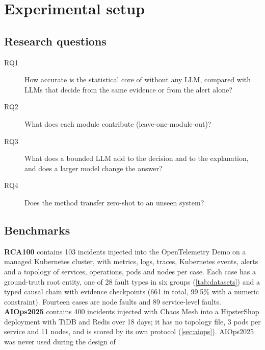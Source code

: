 \section{Experimental setup}\label{sec:setup}

\subsection{Research questions}
\begin{description}
\item[RQ1] How accurate is the statistical core of \gama{} without any LLM, compared with LLMs that decide from the same evidence or
from the alert alone?
\item[RQ2] What does each module contribute (leave-one-module-out)?
\item[RQ3] What does a bounded LLM add to the decision and to the explanation, and does a larger model change the answer?
\item[RQ4] Does the method transfer zero-shot to an unseen system?
\end{description}

\subsection{Benchmarks}
\textbf{RCA100} \citep{cai2026benchmark} contains 103 incidents injected into the OpenTelemetry Demo on a managed Kubernetes
cluster, with metrics, logs, traces, Kubernetes events, alerts and a topology of services, operations, pods and nodes per case.
Each case has a ground-truth root entity, one of 28 fault types in six groups (\cref{tab:datasets}) and a typed causal chain with
evidence checkpoints (661 in total, 99.5\% with a numeric constraint). Fourteen cases are node faults and 89 service-level faults.
\textbf{AIOps2025} \citep{cai2026benchmark} contains 400 incidents injected with Chaos Mesh \citep{chaosmesh} into a HipsterShop
deployment with TiDB and Redis over 18 days; it has no topology file, 3 pods per service and 11 nodes, and is scored by its own
protocol (\cref{sec:aiops}). AIOps2025 was never used during the design of \gama{}.

